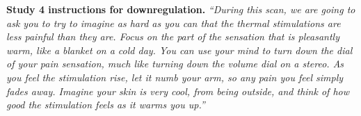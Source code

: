 \documentclass{article}
\begin{document}
\textbf{Study 4 instructions for downregulation.}
\textit{``During this scan, we are going to ask you to try to imagine as hard as you can that the thermal stimulations are less painful than they are. Focus on the part of the sensation that is pleasantly warm, like a blanket on a cold day. You can use your mind to turn down the dial of your pain sensation, much like turning down the volume dial on a stereo. As you feel the stimulation rise, let it numb your arm, so any pain you feel simply fades away. Imagine your skin is very cool, from being outside, and think of how good the stimulation feels as it warms you up.''}
\printglossaries






\end{document}
